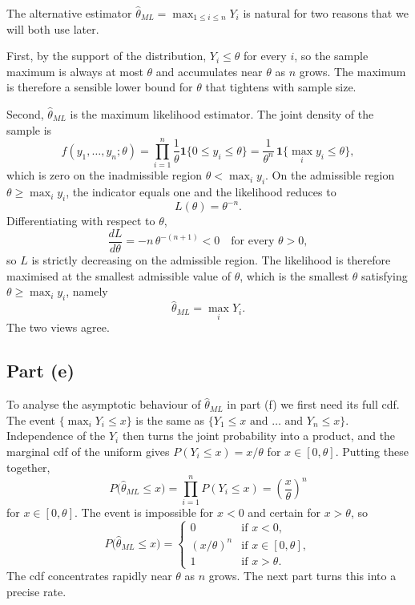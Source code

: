 The alternative estimator $\widehat\theta_{ML} = \max_{1 \le i \le n} Y_i$ is natural for two reasons that we will both use later.

First, by the support of the distribution, $Y_i \le \theta$ for every $i$, so the sample maximum is always at most $\theta$ and accumulates near $\theta$ as $n$ grows. The maximum is therefore a sensible lower bound for $\theta$ that tightens with sample size.

Second, $\widehat\theta_{ML}$ is the maximum likelihood estimator. The joint density of the sample is
\[
f(y_1, \dots, y_n; \theta) = \prod_{i=1}^n \frac{1}{\theta} \mathbf{1}\{0 \le y_i \le \theta\} = \frac{1}{\theta^n}\, \mathbf{1}\bigl\{\max_i y_i \le \theta\bigr\},
\]
which is zero on the inadmissible region $\theta < \max_i y_i$. On the admissible region $\theta \ge \max_i y_i$, the indicator equals one and the likelihood reduces to
\[
L(\theta) = \theta^{-n}.
\]
Differentiating with respect to $\theta$,
\[
\frac{d L}{d \theta} = -n\, \theta^{-(n+1)} < 0 \quad \text{for every } \theta > 0,
\]
so $L$ is strictly decreasing on the admissible region. The likelihood is therefore maximised at the smallest admissible value of $\theta$, which is the smallest $\theta$ satisfying $\theta \ge \max_i y_i$, namely
\[
\widehat\theta_{ML} = \max_i Y_i.
\]
The two views agree.

\subsection*{Part (e)}

To analyse the asymptotic behaviour of $\widehat\theta_{ML}$ in part (f) we first need its full cdf. The event $\{\max_i Y_i \le x\}$ is the same as $\{Y_1 \le x \text{ and } \dots \text{ and } Y_n \le x\}$. Independence of the $Y_i$ then turns the joint probability into a product, and the marginal cdf of the uniform gives $P(Y_i \le x) = x/\theta$ for $x \in [0, \theta]$. Putting these together,
\[
P\bigl(\widehat\theta_{ML} \le x\bigr) = \prod_{i=1}^n P(Y_i \le x) = \left(\frac{x}{\theta}\right)^n
\]
for $x \in [0, \theta]$. The event is impossible for $x < 0$ and certain for $x > \theta$, so
\[
P\bigl(\widehat\theta_{ML} \le x\bigr) =
\begin{cases}
0 & \text{if } x < 0, \\
(x/\theta)^n & \text{if } x \in [0, \theta], \\
1 & \text{if } x > \theta.
\end{cases}
\]
The cdf concentrates rapidly near $\theta$ as $n$ grows. The next part turns this into a precise rate.

